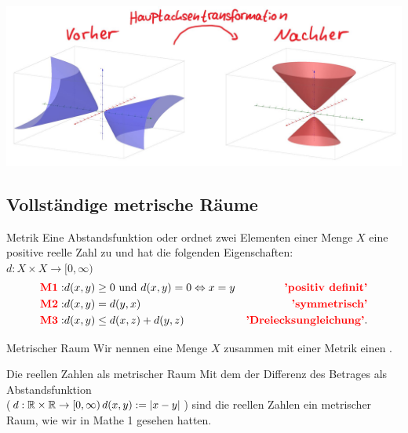 \begin{Beispiel}
    \begin{center}
        \includegraphics[width=.95\textwidth]{Dateien/05/05Quadrik6.JPG}
    \end{center}
\end{Beispiel}

\subsection{Vollständige metrische Räume}
\begin{Wiederholung}
{Metrik}
Eine Abstandsfunktion oder  ordnet zwei Elementen einer Menge $X$ eine positive reelle Zahl zu und hat die folgenden Eigenschaften:\\
$d:X\times X\to [0,\infty)$
\begin{eqnarray*}
\textcolor{red}{\textbf{M1}}: & d(x,y)\geq 0\text{ und } d(x,y)=0\Leftrightarrow x= y &\textcolor{red}{\textbf{'positiv definit'}}\\
\textcolor{red}{\textbf{M2}}: & d(x,y)=d(y, x) &\textcolor{red}{\textbf{'symmetrisch'}}\\
\textcolor{red}{\textbf{M3}}: & d(x,y)\leq d(x, z)+d(y,z) & \textcolor{red}{\textbf{'Dreiecksungleichung'}}.
\end{eqnarray*}
\end{Wiederholung}
\begin{Def}
{Metrischer Raum}
Wir nennen eine Menge $X$ zusammen mit einer Metrik einen .
\end{Def}
\begin{Beispiel}
{Die reellen Zahlen als metrischer Raum}
Mit dem der Differenz des Betrages als Abstandsfunktion\\ ($d:\mathbb{R}\times\mathbb{R}\to[0,\infty)\,d(x,y):=\left|{x-y}\right|$) sind die reellen Zahlen ein metrischer Raum, wie wir in Mathe 1 gesehen hatten.
\end{Beispiel}

